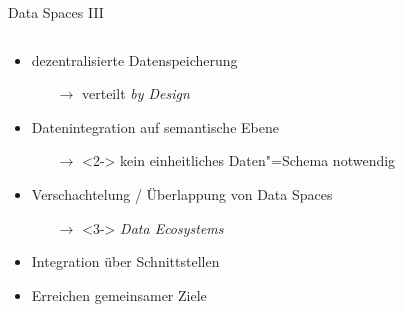 \begin{frame}{Data Spaces III \footnotesize\cite{mollerIndustrialDataEcosystems2024}}
    \begin{columns}
        \begin{column}{0.6\textwidth}
            \begin{itemize}
                \item dezentralisierte Datenspeicherung
                \begin{itemize}
                    \item[$\to$] verteilt \emph{by Design} %
                \end{itemize}
                
                \item<2-> Datenintegration auf semantische Ebene
                \begin{itemize}
                    \item[$\to$]<2-> kein einheitliches Daten"=Schema notwendig
                \end{itemize}
                
                \item<3-> Verschachtelung / Überlappung von Data Spaces
                \begin{itemize}
                    \item[$\to$]<3-> \emph{Data Ecosystems}
                \end{itemize}
                
                \item<4-> Integration über Schnittstellen
                \item<4-> Erreichen gemeinsamer Ziele
            \end{itemize}
        \end{column}


\end{columns}
\end{frame}
